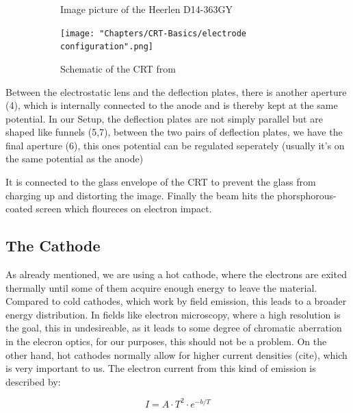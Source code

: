 \begin{figure}
	\centering
	\begin{subfigure}{.5\textwidth}
		\centering
		\caption{Image picture of the Heerlen D14-363GY}
		\label{fig:FotoCRT}
	\end{subfigure}%
	\begin{subfigure}{.5\textwidth}
		\centering
		\texttt{[image: "Chapters/CRT-Basics/electrode configuration".png]}
		\caption{Schematic of the CRT from \cite{D14363GY123-manual}}
		\label{fig:SchemeCRT}
	\end{subfigure}
	\caption{}
	\label{}
\end{figure}


Between the electrostatic lens and the deflection plates, there is another aperture (4), which is internally connected to the anode and is thereby kept at the same potential. In our Setup, the deflection plates are not simply parallel but are shaped like funnels (5,7), between the two pairs of deflection plates, we have the final aperture (6), this ones potential can be regulated seperately (usually it's on the same potential as the anode) 

It is connected to the glass envelope of the CRT to prevent the glass from charging up and distorting the image. 
Finally the beam hits the phorsphorous-coated screen which floureces on electron impact.

\subsection{The Cathode}

As already mentioned, we are using a hot cathode, where the electrons are exited thermally until some of them acquire enough energy to leave the material. Compared to cold cathodes, which work by field emission, this leads to a broader energy distribution. In fields like electron microscopy, where a high resolution is the goal, this in undesireable, as it leads to some degree of chromatic aberration in the elecron optics, for our purposes, this should not be a problem. On the other hand, hot cathodes normally allow for higher current densities  (cite), which is very important to us. The  electron current from this kind of emission is described by:\cite{PowerTubes323} 

\begin{equation}\label{eq:thermionic_current}
I=A\cdot T^2 \cdot e^{-b/T}
\end{equation}

